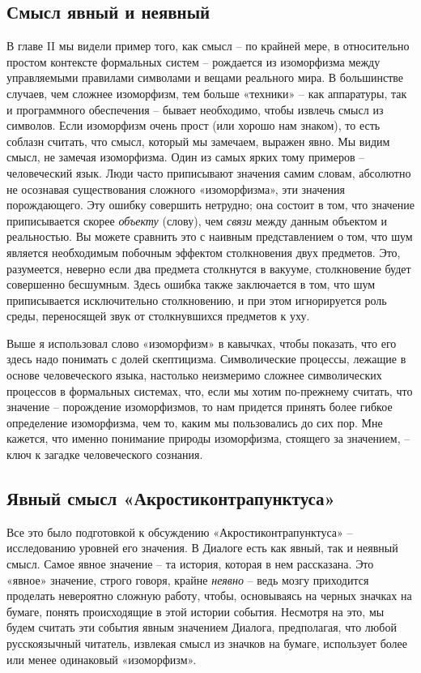\documentclass[../main.tex]{subfiles}
\begin{document}

\subsection{Смысл явный и неявный}

В главе II мы видели пример того, как смысл \--- по крайней мере, в относительно простом контексте формальных систем \--- рождается из изоморфизма между управляемыми правилами символами и вещами реального мира. В большинстве случаев, чем сложнее изоморфизм, тем больше «техники» \--- как аппаратуры, так и программного обеспечения \--- бывает необходимо, чтобы извлечь смысл из символов. Если изоморфизм очень прост (или хорошо нам знаком), то есть соблазн считать, что смысл, который мы замечаем, выражен явно. Мы видим смысл, не замечая изоморфизма. Один из самых ярких тому примеров \--- человеческий язык. Люди часто приписывают значения самим словам, абсолютно не осознавая существования сложного «изоморфизма», эти значения порождающего. Эту ошибку совершить нетрудно; она состоит в том, что значение приписывается скорее \emph{объекту} (слову), чем \emph{связи} между данным объектом и реальностью. Вы можете сравнить это с наивным представлением о том, что шум является необходимым побочным эффектом столкновения двух предметов. Это, разумеется, неверно если два предмета столкнутся в вакууме, столкновение будет совершенно бесшумным. Здесь ошибка также заключается в том, что шум приписывается исключительно столкновению, и при этом игнорируется роль среды, переносящей звук от столкнувшихся предметов к уху.

Выше я использовал слово «изоморфизм» в кавычках, чтобы показать, что его здесь надо понимать с долей скептицизма. Символические процессы, лежащие в основе человеческого языка, настолько неизмеримо сложнее символических процессов в формальных системах, что, если мы хотим по-прежнему считать, что значение \--- порождение изоморфизмов, то нам придется принять более гибкое определение изоморфизма, чем то, каким мы пользовались до сих пор. Мне кажется, что именно понимание природы изоморфизма, стоящего за значением, \--- ключ к загадке человеческого сознания.


\subsection{Явный смысл «Акростиконтрапунктуса»}

Все это было подготовкой к обсуждению «Акростиконтрапунктуса» \--- исследованию уровней его значения. В Диалоге есть как явный, так и неявный смысл. Самое явное значение \--- та история, которая в нем рассказана. Это «явное» значение, строго говоря, крайне \emph{неявно} \--- ведь мозгу приходится проделать невероятно сложную работу, чтобы, основываясь на черных значках на бумаге, понять происходящие в этой истории события. Несмотря на это, мы будем считать эти события явным значением Диалога, предполагая, что любой русскоязычный читатель, извлекая смысл из значков на бумаге, использует более или менее одинаковый «изоморфизм».
\end{document}
